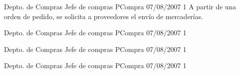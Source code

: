 \begin{apx1}
{Depto. de Compras}
{Jefe de compras}
{PCompra}
{07/08/2007}
{1}
{A partir de una orden de pedido, se solicita a proveedores el envío de mercaderías.}
\end{apx1}

\begin{apx2}
{Depto. de Compras}
{Jefe de compras}
{PCompra}
{07/08/2007}
{1}
\end{apx2}

\begin{apx3}
{Depto. de Compras}
{Jefe de compras}
{PCompra}
{07/08/2007}
{1}
\end{apx3}

\begin{apx4}
{Depto. de Compras}
{Jefe de compras}
{PCompra}
{07/08/2007}
{1}
\end{apx4}

